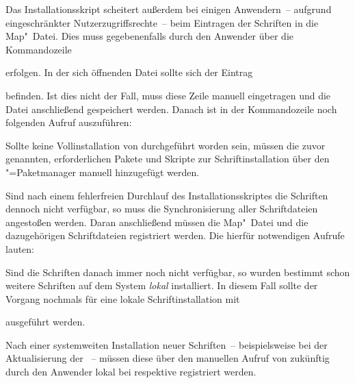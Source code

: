 Das Installationsskript scheitert außerdem bei einigen Anwendern~-- aufgrund 
eingeschränkter Nutzerzugriffsrechte~-- beim Eintragen der Schriften in die 
Map"~Datei. Dies muss gegebenenfalls durch den Anwender über die Kommandozeile 
%
\begin{quoting}
\end{quoting}
%
erfolgen. In der sich öffnenden Datei sollte sich der Eintrag 
\begin{quoting}
\end{quoting}
befinden. Ist dies nicht der Fall, muss diese Zeile manuell eingetragen und die 
Datei anschließend gespeichert werden. Danach ist in der Kommandozeile noch 
folgenden Aufruf auszuführen:
%
\begin{quoting}
\end{quoting}


%
Sollte keine Vollinstallation von \TeXLive durchgeführt worden sein, müssen die 
zuvor genannten, erforderlichen Pakete und Skripte zur Schriftinstallation über 
den \TeXLive"=Paketmanager manuell hinzugefügt werden.

Sind nach einem fehlerfreien Durchlauf des Installationsskriptes die Schriften 
dennoch nicht verfügbar, so muss die Synchronisierung aller Schriftdateien 
angestoßen werden. Daran anschließend müssen die Map"~Datei und die 
dazugehörigen Schriftdateien registriert werden. Die hierfür notwendigen 
Aufrufe lauten:
%
\begin{quoting}
\newline
{}\newline
{}
\end{quoting}
%
Sind die Schriften danach immer noch nicht verfügbar, so wurden bestimmt schon 
weitere Schriften auf dem System \emph{lokal} installiert. In diesem Fall 
sollte der Vorgang nochmals für eine lokale Schriftinstallation mit 
%
\begin{quoting}
\newline
{}\newline
{}
\end{quoting}
%
ausgeführt werden. 

Nach einer systemweiten Installation neuer Schriften~-- beispielsweise bei der 
Aktualisierung der \DistributionGeneral~-- müssen diese über den manuellen 
Aufruf von  zukünftig durch den Anwender lokal bei 
\TeXLive respektive \MacTeX registriert werden.



